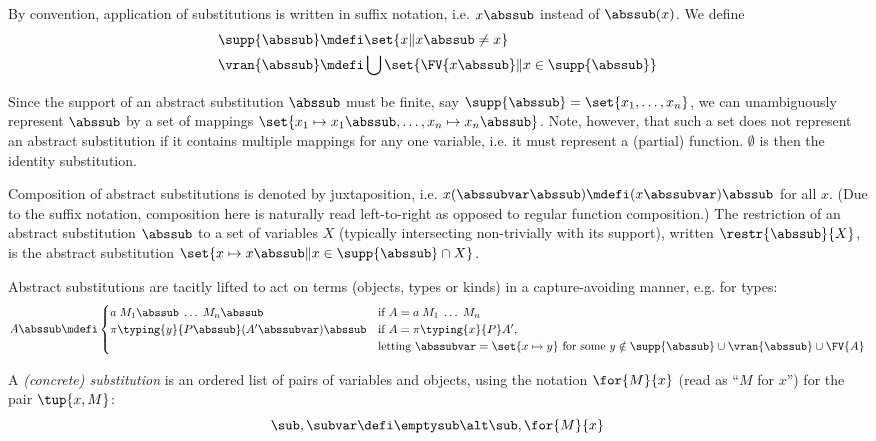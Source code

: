 By convention, application of substitutions is written in suffix notation, i.e. $x \abssub$ instead of $\abssub(x)$.
We define
\begin{align*}
  \supp{\abssub} &\mdefi \set{x \| x \abssub \neq x} \\
  \vran{\abssub} &\mdefi \bigcup{\set{\FV{x \abssub} \| x \in \supp{\abssub}}}
\end{align*}

Since the support of an abstract substitution $\abssub$ must be finite, say $\supp{\abssub} = \set{x_1, \ldots, x_n}$, we can unambiguously represent $\abssub$ by a set of mappings $\set{x_1 \mapsto x_1 \abssub, \ldots, x_n \mapsto x_n \abssub}$.
Note, however, that such a set does not represent an abstract substitution if it contains multiple mappings for any one variable, i.e. it must represent a (partial) function.
$\emptyset$ is then the identity substitution.

Composition of abstract substitutions is denoted by juxtaposition, i.e. $x (\abssubvar \abssub) \mdefi (x \abssubvar) \abssub$ for all $x$.
(Due to the suffix notation, composition here is naturally read left-to-right as opposed to regular function composition.)
The restriction of an abstract substitution $\abssub$ to a set of variables $X$ (typically intersecting non-trivially with its support), written $\restr{\abssub}{X}$, is the abstract substitution $\set{x \mapsto x \abssub \| x \in \supp{\abssub} \cap X}$.

Abstract substitutions are tacitly lifted to act on terms (objects, types or kinds) in a capture-avoiding manner, e.g. for types:
\[ A \abssub \mdefi
  \begin{cases}
    a \; M_1 \abssub \; \ldots \; M_n \abssub           & \text{if $A = a \; M_1 \; \ldots \; M_n$} \\
    \pi{\typing{y}{P \abssub}}{(A' \abssubvar) \abssub} & \text{if $A = \pi{\typing{x}{P}}{A'}$,} \\
                                                        & \text{letting $\abssubvar = \set{x \mapsto y}$ for some $y \notin \supp{\abssub} \cup \vran{\abssub} \cup \FV{A}$}
  \end{cases}
\]

\begin{definition}
\label{def:concrete-substitution}
A \emph{(concrete) substitution} is an ordered list of pairs of variables and objects, using the notation $\for{M}{x}$ (read as ``$M$ for $x$'') for the pair $\tup{x, M}$:
\[ \sub, \subvar \defi \emptysub \alt \sub, \for{M}{x} \]
\end{definition}

